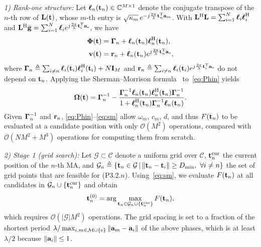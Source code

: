 \documentclass[journal]{IEEEtran}
\begin{document}
\textit{1) Rank-one structure:} Let $\boldsymbol{\ell}_n(\mathbf{t}_n)\in\mathbb C^{M\times1}$ denote the conjugate transpose of the $n$-th row of $\mathbf{L}(\mathbf{t})$, whose $m$-th entry is $\sqrt{\kappa_m}\,e^{-j\frac{2\pi}{\lambda}\mathbf{t}_n^{\mathrm T}\mathbf{a}_m}$. With $\mathbf{L}^{\mathrm H}\mathbf{L}=\sum_{i=1}^N\boldsymbol{\ell}_i\boldsymbol{\ell}_i^{\mathrm H}$ and $\mathbf{L}^{\mathrm H}\bar{\mathbf{g}}=\sum_{i=1}^N\boldsymbol{\ell}_ie^{j\frac{2\pi}{\lambda}\mathbf{t}_i^{\mathrm T}\mathbf{a}_{\mathrm e}}$, we have
\begin{align}
\boldsymbol{\Phi}(\mathbf{t})&=\boldsymbol{\Gamma}_n+\boldsymbol{\ell}_n(\mathbf{t}_n)\boldsymbol{\ell}_n^{\mathrm H}(\mathbf{t}_n),\label{eq:Phin}\\
\mathbf{v}(\mathbf{t})&=\mathbf{r}_n+\boldsymbol{\ell}_n(\mathbf{t}_n)e^{j\frac{2\pi}{\lambda}\mathbf{t}_n^{\mathrm T}\mathbf{a}_{\mathrm e}},\label{eq:vn}
\end{align}
where $\boldsymbol{\Gamma}_n\triangleq\sum_{i\neq n}\boldsymbol{\ell}_i(\mathbf{t}_i)\boldsymbol{\ell}_i^{\mathrm H}(\mathbf{t}_i)+N\mathbf{I}_M$ and $\mathbf{r}_n\triangleq\sum_{i\neq n}\boldsymbol{\ell}_i(\mathbf{t}_i)e^{j\frac{2\pi}{\lambda}\mathbf{t}_i^{\mathrm T}\mathbf{a}_{\mathrm e}}$ do not depend on $\mathbf{t}_n$. Applying the Sherman--Morrison formula~\cite{Horn2013} to~\eqref{eq:Phin} yields
\begin{equation}\label{eq:sm}
\boldsymbol{\Omega}(\mathbf{t})=\boldsymbol{\Gamma}_n^{-1}-\frac{\boldsymbol{\Gamma}_n^{-1}\boldsymbol{\ell}_n(\mathbf{t}_n)\boldsymbol{\ell}_n^{\mathrm H}(\mathbf{t}_n)\boldsymbol{\Gamma}_n^{-1}}{1+\boldsymbol{\ell}_n^{\mathrm H}(\mathbf{t}_n)\boldsymbol{\Gamma}_n^{-1}\boldsymbol{\ell}_n(\mathbf{t}_n)}.
\end{equation}
Given $\boldsymbol{\Gamma}_n^{-1}$ and $\mathbf{r}_n$, \eqref{eq:Phin}--\eqref{eq:sm} allow $\omega_m$, $c_m$, $d$, and thus $F(\mathbf{t}_n)$ to be evaluated at a candidate position with only $\mathcal O(M^2)$ operations, compared with $\mathcal O(NM^2+M^3)$ operations for computing them from scratch.

\textit{2) Stage 1 (grid search):} Let $\mathcal G\subset\mathcal C$ denote a uniform grid over $\mathcal C$, $\mathbf{t}_n^{\mathrm{cur}}$ the current position of the $n$-th MA, and $\mathcal G_n\triangleq\{\mathbf{t}_n\in\mathcal G\,|\,\|\mathbf{t}_n-\mathbf{t}_i\|\ge D_{\min},\ \forall i\neq n\}$ the set of grid points that are feasible for (P3.2.$n$). Using~\eqref{eq:sm}, we evaluate $F(\mathbf{t}_n)$ at all candidates in $\mathcal G_n\cup\{\mathbf{t}_n^{\mathrm{cur}}\}$ and obtain
\begin{equation}\label{eq:gridsearch}
\mathbf{t}_n^{(0)}=\arg\max_{\mathbf{t}_n\in\mathcal G_n\cup\{\mathbf{t}_n^{\mathrm{cur}}\}}F(\mathbf{t}_n),
\end{equation}
which requires $\mathcal O(|\mathcal G|M^2)$ operations. The grid spacing is set to a fraction of the shortest period $\lambda/\max_{i,m\in\mathcal M\cup\{\mathrm e\}}\|\mathbf{a}_{m}-\mathbf{a}_i\|$ of the above phases, which is at least $\lambda/2$ because $\|\mathbf{a}_i\|\le1$.
\end{document}
